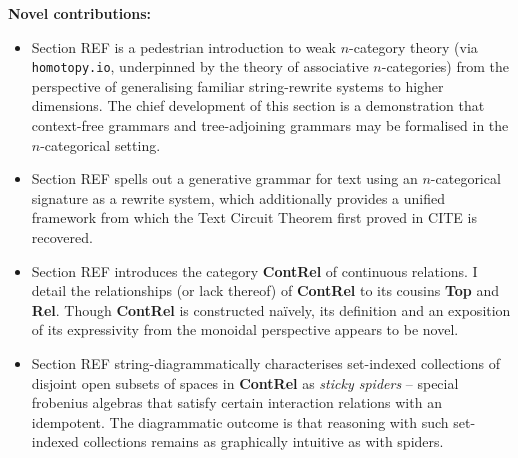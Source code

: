 


\thispagestyle{empty}%
\maketitle%


\tableofcontents{}

\newpage
\vfill
\begin{myboxB}
\centering
\textbf{Novel contributions:}
\begin{itemize}

\item Section \bR REF \e is a pedestrian introduction to weak $n$-category theory (via \texttt{homotopy.io}, underpinned by the theory of associative $n$-categories) from the perspective of generalising familiar string-rewrite systems to higher dimensions. The chief development of this section is a demonstration that context-free grammars and tree-adjoining grammars may be formalised in the $n$-categorical setting.

\item Section \bR REF \e spells out a generative grammar for text using an $n$-categorical signature as a rewrite system, which additionally provides a unified framework from which the Text Circuit Theorem first proved in \bR CITE \e is recovered.

\item Section \bR REF \e introduces the category \textbf{ContRel} of continuous relations. I detail the relationships (or lack thereof) of \textbf{ContRel} to its cousins \textbf{Top} and \textbf{Rel}. Though \textbf{ContRel} is constructed na\"{i}vely, its definition and an exposition of its expressivity from the monoidal perspective appears to be novel.

\item Section \bR REF \e string-diagrammatically characterises set-indexed collections of disjoint open subsets of spaces in \textbf{ContRel} as \emph{sticky spiders} -- special frobenius algebras that satisfy certain interaction relations with an idempotent. The diagrammatic outcome is that reasoning with such set-indexed collections remains as graphically intuitive as with spiders.


\end{itemize}
\end{myboxB}
